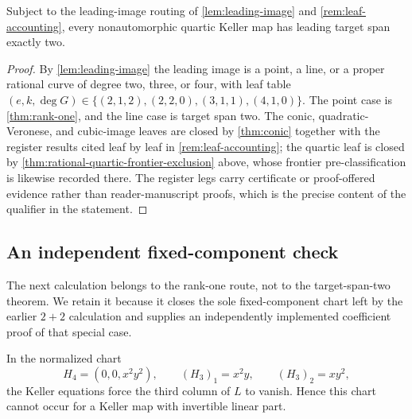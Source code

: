 \begin{corollary}
\label{cor:quartic-target-span-two}
Subject to the leading-image routing of \cref{lem:leading-image} and
\cref{rem:leaf-accounting}, every nonautomorphic quartic Keller map has
leading target span exactly two.
\end{corollary}

\begin{proof}
By \cref{lem:leading-image} the leading image is a point, a line, or a
proper rational curve of degree two, three, or four, with leaf table
\((e,k,\deg G)\in\{(2,1,2),(2,2,0),(3,1,1),(4,1,0)\}\).  The point
case is \cref{thm:rank-one}, and the line case is target span two.  The
conic, quadratic-Veronese, and cubic-image leaves are closed by
\cref{thm:conic} together with the register results cited leaf by leaf
in \cref{rem:leaf-accounting}; the quartic leaf is closed by
\cref{thm:rational-quartic-frontier-exclusion} above, whose frontier
pre-classification is likewise recorded there.  The register legs carry
certificate or proof-offered evidence rather than reader-manuscript
proofs, which is the precise content of the qualifier in the statement.
\end{proof}

\subsection{An independent fixed-component check}

The next calculation belongs to the rank-one route, not to the
target-span-two theorem.  We retain it because it closes the sole
fixed-component chart left by the earlier \(2+2\) calculation and supplies
an independently implemented coefficient proof of that special case.

\begin{proposition}
\label{prop:plucker-fixed-component}
In the normalized chart
\[
H_4=(0,0,x^2y^2),\qquad
(H_3)_1=x^2y,\qquad (H_3)_2=xy^2,
\]
the Keller equations force the third column of \(L\) to vanish.  Hence this
chart cannot occur for a Keller map with invertible linear part.
\end{proposition}


